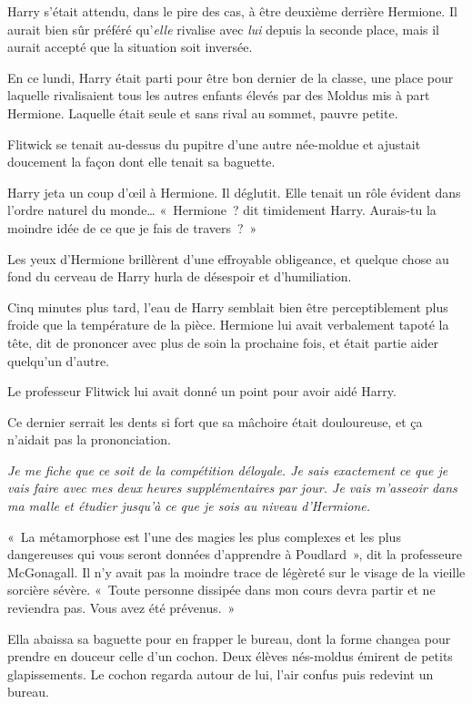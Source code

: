 Harry s'était attendu, dans le pire des cas, à être deuxième derrière Hermione.
Il aurait bien sûr préféré qu'\emph{elle} rivalise avec \emph{lui} depuis la seconde place, mais il aurait accepté que la situation soit inversée.

En ce lundi, Harry était parti pour être bon dernier de la classe, une place pour laquelle rivalisaient tous les autres enfants élevés par des Moldus mis à part Hermione.
Laquelle était seule et sans rival au sommet, pauvre petite.

Flitwick se tenait au-dessus du pupitre d'une autre née-moldue et ajustait doucement la façon dont elle tenait sa baguette.

Harry jeta un coup d'œil à Hermione.
Il déglutit.
Elle tenait un rôle évident dans l'ordre naturel du monde…
«~Hermione~? dit timidement Harry.
Aurais-tu la moindre idée de ce que je fais de travers~?~»

Les yeux d'Hermione brillèrent d'une effroyable obligeance, et quelque chose au fond du cerveau de Harry hurla de désespoir et d'humiliation.

Cinq minutes plus tard, l'eau de Harry semblait bien être perceptiblement plus froide que la température de la pièce.
Hermione lui avait verbalement tapoté la tête, dit de prononcer avec plus de soin la prochaine fois, et était partie aider quelqu'un d'autre.

Le professeur Flitwick lui avait donné un point pour avoir aidé Harry.

Ce dernier serrait les dents si fort que sa mâchoire était douloureuse, et ça n'aidait pas la prononciation.

\emph{Je me fiche que ce soit de la compétition déloyale.
Je sais exactement ce que je vais faire avec mes deux heures supplémentaires par jour.
Je vais m'asseoir dans ma malle et étudier jusqu'à ce que je sois au niveau d'Hermione.}

\later

«~La métamorphose est l'une des magies les plus complexes et les plus dangereuses qui vous seront données d'apprendre à Poudlard~», dit la professeure McGonagall.
Il n'y avait pas la moindre trace de légèreté sur le visage de la vieille sorcière sévère.
«~Toute personne dissipée dans mon cours devra partir et ne reviendra pas.
Vous avez été prévenus.~»

Ella abaissa sa baguette pour en frapper le bureau, dont la forme changea pour prendre en douceur celle d'un cochon.
Deux élèves nés-moldus émirent de petits glapissements.
Le cochon regarda autour de lui, l'air confus puis redevint un bureau.

